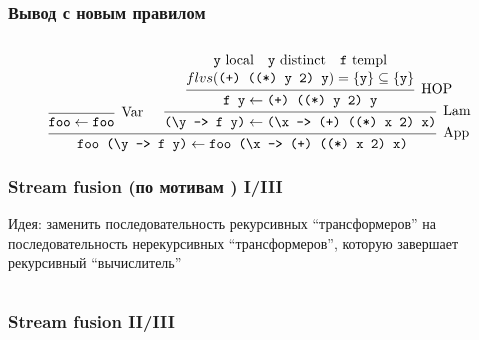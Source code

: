 \documentclass[
    aspectratio=169,
]{beamer}
\begin{document}
\begin{frame}
    \frametitle{Вывод с новым правилом}

    \inputminted[firstline=131, lastline=131]{text}{Code.hs}

    \[
        \begin{prooftree}
            \infer0[Var]{\text{\texttt{foo}} \leftarrow \text{\texttt{foo}}}
            \hypo{\text{\texttt{y} local}\quad \text{\texttt{y} distinct}\quad \text{\texttt{f} templ}}
            \infer[rule style=no rule]1[]{flvs(\text{\texttt{(+) ((*) y 2) y}}) = \{\text{\texttt{y}}\} \subseteq \{\text{\texttt{y}}\}}
            \infer1[HOP]{\text{\texttt{f y}} \leftarrow \text{\texttt{(+) ((*) y 2) y}}}
            \infer1[Lam]{\text{\texttt{(\textbackslash{}y -> f y)}} \leftarrow \text{\texttt{(\textbackslash{}x -> (+) ((*) x 2) x)}}}
            \infer2[App]{\text{\texttt{foo (\textbackslash{}y -> f y)}} \leftarrow \text{\texttt{foo (\textbackslash{}x -> (+) ((*) x 2) x)}}}
        \end{prooftree}
    \]
\end{frame}

\begin{frame}
    \frametitle{Stream fusion (по мотивам \cite{farmerHERMITStreamFusing2014}) I/III}

    Идея: заменить последовательность рекурсивных \enquote{трансформеров} на последовательность нерекурсивных \enquote{трансформеров}, которую завершает рекурсивный \enquote{вычислитель}

    \vspace{1em}
    \inputminted[firstline=133, lastline=136]{haskell}{Code.hs}

\end{frame}

\begin{frame}
    \frametitle{Stream fusion II/III}

    \begin{columns}[T]
        \begin{column}{0.48\textwidth}
            \inputminted[firstline=138, lastline=142]{haskell}{Code.hs}
        \end{column}
        \begin{column}{0.49\textwidth}
            \inputminted[firstline=144, lastline=149]{haskell}{Code.hs}
        \end{column}
    \end{columns}

    \inputminted[firstline=154, lastline=159]{haskell}{Code.hs}
    \inputminted[firstline=151, lastline=152]{haskell}{Code.hs}

\end{frame}
\end{document}
